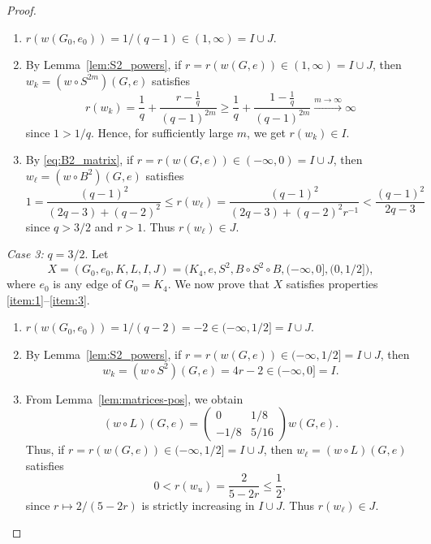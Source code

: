 \documentclass[10pt,a4paper]{amsart}
\begin{document}
\begin{proof}
\begin{enumerate}
    \item $r(w(G_0,e_0)) = 1/(q-1)\in (1,\infty)=I \cup J$.
    \item By Lemma~\ref{lem:S2_powers}, if $r = r(w(G,e)) \in (1,\infty) = I \cup J$, then $w_k = (w \circ S^{2m})(G,e)$ satisfies 
    \begin{equation*}
        r(w_k)= \frac{1}{q} + \frac{r - \frac{1}{q}}{(q-1)^{2m}} \geq \frac{1}{q} + \frac{1 - \frac{1}{q}}{(q-1)^{2m}} \overset{m \to \infty}{\longrightarrow} \infty
    \end{equation*}
    since $1> 1/q$. Hence, for sufficiently large $m$, we get $r(w_k) \in I$.
    \item By \eqref{eq:B2_matrix}, if $r = r(w(G,e)) \in (-\infty,0) = I \cup J$, then $w_\ell = (w \circ B^2)(G,e)$ satisfies
    \begin{equation*}
        1 = \frac{(q-1)^2}{(2q-3) + (q-2)^2}\leq r(w_\ell) = \frac{(q-1)^2}{(2q-3) + (q-2)^2 r^{-1}} < \frac{(q-1)^2}{2q-3}
    \end{equation*}
    since $q>3/2$ and $r>1$. Thus 
    $r(w_\ell)\in J$.
\end{enumerate}
\emph{Case 3:} $q = 3/2$. Let \[X =(G_0,e_0,K,L,I,J)=
\big(K_4,e,S^2,B\circ S^2\circ B, (-\infty,0], (0,1/2]\big),\]
where $e_0$ is any edge of $G_0=K_4$.
We now prove that $X$ satisfies properties \eqref{item:1}--\eqref{item:3}.
\begin{enumerate}
    \item $r(w(G_0,e_0)) = 1/(q-2) = -2\in (-\infty,1/2]=I \cup J$.
    \item By Lemma~\ref{lem:S2_powers}, if $r = r(w(G,e)) \in (-\infty,1/2] = I \cup J$, then \[w_k = (w \circ S^{2})(G,e) =4r-2 \in (-\infty,0] = I.\]
    
    \item From Lemma~\ref{lem:matrices-pos}, we obtain
     \begin{equation*}
        (w \circ L) (G,e) = \begin{pmatrix}
            0 & 1/8 \\
            -1/8 & 5/16
        \end{pmatrix} w(G,e). \end{equation*}
    Thus, if $r = r(w(G,e)) \in (-\infty,1/2]= I \cup J$, then $w_\ell = (w \circ L)(G,e)$ satisfies     \begin{equation*}
        0 < r(w_u) = \frac{2}{5 - 2 r } \leq \frac{1}{2},
    \end{equation*}
    since $r\mapsto 2/(5-2r)$ is strictly increasing in $I\cup J$. Thus 
    $r(w_\ell)\in J$. \qedhere
\end{enumerate}
\end{proof}
\end{document}

